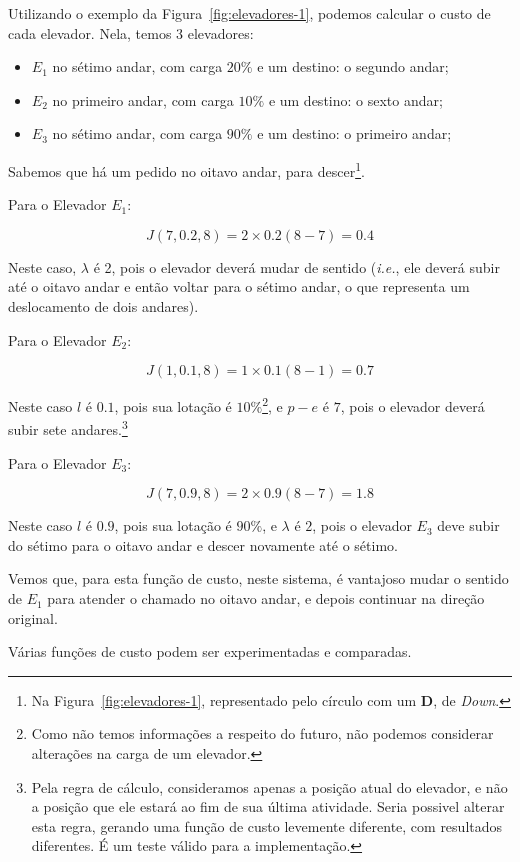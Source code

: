 Utilizando o exemplo da Figura~\ref{fig:elevadores-1}, podemos calcular o custo
de cada elevador. Nela, temos 3 elevadores:

\begin{itemize}
\item \textbf{$E_{1}$} no sétimo andar, com carga $20\%$ e um destino: o segundo andar;
\item \textbf{$E_{2}$} no primeiro andar, com carga $10\%$ e um destino: o sexto andar;
\item \textbf{$E_{3}$} no sétimo andar, com carga $90\%$ e um destino: o primeiro andar;
\end{itemize}

Sabemos que há um pedido no oitavo andar, para descer\footnote{Na
  Figura~\ref{fig:elevadores-1}, representado pelo círculo com um \textbf{D}, de
\textit{Down}.}.

Para o Elevador $E_{1}$:

\[J(7, 0.2, 8) = 2 \times 0.2(8 - 7) = 0.4\]

Neste caso, $\lambda$ é 2, pois o elevador deverá mudar de sentido
(\textit{i.e.}, ele deverá subir até o oitavo andar e então voltar para o sétimo
andar, o que representa um deslocamento de dois andares).

Para o Elevador $E_{2}$:

\[J(1, 0.1, 8) = 1 \times 0.1(8 - 1) = 0.7\]

Neste caso $l$ é $0.1$, pois sua lotação é $10\%$\footnote{Como não temos informações a
respeito do futuro, não podemos considerar alterações na carga de um elevador.},
e $p - e$ é $7$, pois o elevador deverá subir sete andares.\footnote{Pela regra
de cálculo, consideramos apenas a posição atual do elevador, e não a posição que
ele estará ao fim de sua última atividade. Seria possivel alterar esta regra,
gerando uma função de custo levemente diferente, com resultados diferentes. É um
teste válido para a implementação.}

Para o Elevador $E_{3}$:

\[J(7, 0.9, 8) = 2 \times 0.9(8 - 7) = 1.8\]

Neste caso $l$ é $0.9$, pois sua lotação é $90\%$, e $\lambda$ é $2$, pois o elevador
$E_{3}$ deve subir do sétimo para o oitavo andar e descer novamente até o sétimo.

Vemos que, para esta função de custo, neste sistema, é vantajoso mudar o sentido
de $E_{1}$ para atender o chamado no oitavo andar, e depois continuar na direção original.

Várias funções de custo podem ser experimentadas e comparadas.


